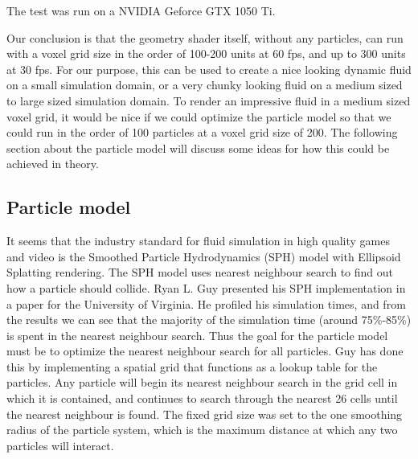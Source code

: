 \documentclass{article}
\begin{document}
\begin{multicols}{2}
        The test was run on a NVIDIA Geforce GTX 1050 Ti.

        Our conclusion is that the geometry shader itself, without any particles, can run with a voxel grid size in the order of 100-200 units at 60 fps, and up to 300 units at 30 fps.
        For our purpose, this can be used to create a nice looking dynamic fluid on a small simulation domain, or a very chunky looking fluid on a medium sized to large sized simulation domain.
        To render an impressive fluid in a medium sized voxel grid, it would be nice if we could optimize the particle model so that we could run in the order of 100 particles at a voxel grid size of 200.
        The following section about the particle model will discuss some ideas for how this could be achieved in theory.

        \subsection{Particle model}
        It seems that the industry standard for fluid simulation in high quality games and video is the Smoothed Particle Hydrodynamics (SPH) model with Ellipsoid Splatting rendering.
        The SPH model uses nearest neighbour search to find out how a particle should collide.
        Ryan L. Guy presented his SPH implementation in a paper for the University of Virginia. He profiled his simulation times, and from the results we can see that the majority of the simulation time (around 75\%-85\%) is spent in the nearest neighbour search.
        Thus the goal for the particle model must be to optimize the nearest neighbour search for all particles.
        Guy has done this by implementing a spatial grid that functions as a lookup table for the particles.
        Any particle will begin its nearest neighbour search in the grid cell in which it is contained, and continues to search through the nearest 26 cells until the nearest neighbour is found.
        The fixed grid size was set to the one smoothing radius of the particle system, which is the maximum distance at which any two particles will interact.
        \cite{guy15}


\end{multicols}
\end{document}
